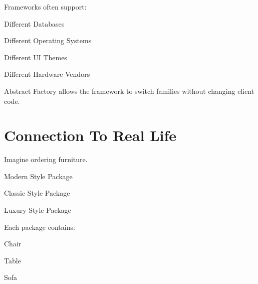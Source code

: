 \documentclass[11pt,a4paper]{book}
\begin{document}
Frameworks often support:


Different Databases


Different Operating Systems


Different UI Themes


Different Hardware Vendors


Abstract Factory allows the
framework to switch families
without changing client code.


\section{Connection To Real Life}

Imagine ordering furniture.


Modern Style Package


Classic Style Package


Luxury Style Package


Each package contains:


Chair


Table


Sofa

\end{document}
